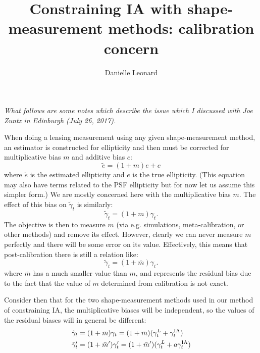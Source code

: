 \documentclass[onecolumn,amsmath,aps,fleqn, superscriptaddress]{revtex4}
\begin{document}
\title{Constraining IA with shape-measurement methods: calibration concern}

\author{Danielle Leonard}

\maketitle

{\it What follows are some notes which describe the issue which I discussed with Joe Zuntz in Edinburgh (July 26, 2017).}

When doing a lensing measurement using any given shape-measurement method, an estimator is constructed for ellipticity and then must be corrected for multiplicative bias $m$ and additive bias $c$:
\begin{equation}
\tilde{e} = (1+m)e + c
\label{bias}
\end{equation}
where $\tilde{e}$ is the estimated ellipticity and $e$ is the true ellipticity.  (This equation may also have terms related to the PSF ellipticity but for now let us assume this simpler form.) We are mostly concerned here with the multiplicative bias $m$. The effect of this bias on $\tilde{\gamma}_t$ is similarly:
\begin{equation}
\tilde{\gamma}_t = (1+m) \gamma_t.
\label{bias_gt}
\end{equation}
The objective is then to measure $m$ (via e.g. simulations, meta-calibration, or other methods) and remove its effect. However, clearly we can never measure $m$ perfectly and there will be some error on its value. Effectively, this means that post-calibration there is still a relation like:
\begin{equation}
\tilde{\gamma}_t = (1+\bar{m}) \gamma_t.
\label{bias_gt_postcal}
\end{equation}
where $\bar{m}$ has a much smaller value than $m$, and represents the residual bias due to the fact that the value of $m$ determined from calibration is not exact.

Consider then that for the two shape-measurement methods used in our method of constraining IA, the multiplicative biases will be independent, so the values of the residual biases will in general be different:
\begin{align}
\tilde{\gamma}_t &= (1+\bar{m}) \gamma_t = (1+\bar{m}) (\gamma_t^L + \gamma_t^{\rm IA}) \nonumber \\ 
\tilde{\gamma}_t^\prime &= (1+\bar{m}^\prime) \gamma_t^\prime =(1+\bar{m}^\prime) (\gamma_t^L + a \gamma_t^{\rm IA})
\label{both_gt_mbar}
\end{align}
\end{document}
